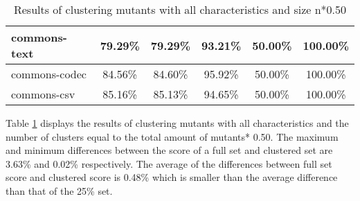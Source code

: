 \documentclass[../../main]{subfiles}
\begin{document}
\begin{table}[!htb]
\begin{tabular}{|l|c|c|c|c|c|}
commons-text                  & 79.29\%                                                                                 & 79.29\%                                                                                     & 93.21\%                                                                              & 50.00\%                                                                               & 100.00\%                                                                             \\ \hline
commons-codec                 & 84.56\%                                                                                 & 84.60\%                                                                                     & 95.92\%                                                                              & 50.00\%                                                                               & 100.00\%                                                                             \\ \hline
commons-csv                   & 85.16\%                                                                                 & 85.13\%                                                                                     & 94.65\%                                                                              & 50.00\%                                                                               & 100.00\%                                                                             \\ \hline
\end{tabular}
\caption{\label{tab:clustering_all_50}Results of clustering mutants with all characteristics and size n*0.50}
\end{table}
\FloatBarrier

Table \ref{tab:clustering_all_50} displays the results of clustering mutants with all characteristics and the number of clusters equal to the total amount of mutants* 0.50.  
The maximum and minimum differences between the score of a full set and clustered set are 3.63\% and 0.02\% respectively.
The average of the differences between full set score and clustered score is 0.48\% which is smaller than the average difference than that of the 25\% set.
\end{document}
